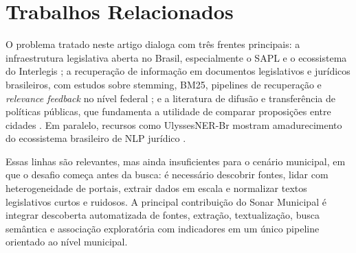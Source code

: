 \section{Trabalhos Relacionados}

O problema tratado neste artigo dialoga com três frentes principais: a infraestrutura legislativa aberta no Brasil, especialmente o SAPL e o ecossistema do Interlegis \cite{interlegis_sapl}; a recuperação de informação em documentos legislativos e jurídicos brasileiros, com estudos sobre stemming, BM25, pipelines de recuperação e \textit{relevance feedback} no nível federal \cite{souza_stemming_2021,vitorio_ir_pipeline_2021,vitorio_rfcorpus_2025}; e a literatura de difusão e transferência de políticas públicas, que fundamenta a utilidade de comparar proposições entre cidades \cite{shipan_volden_2008}. Em paralelo, recursos como UlyssesNER-Br mostram amadurecimento do ecossistema brasileiro de NLP jurídico \cite{albuquerque_ulyssesner_2022}.

Essas linhas são relevantes, mas ainda insuficientes para o cenário municipal, em que o desafio começa antes da busca: é necessário descobrir fontes, lidar com heterogeneidade de portais, extrair dados em escala e normalizar textos legislativos curtos e ruidosos. A principal contribuição do Sonar Municipal é integrar descoberta automatizada de fontes, extração, textualização, busca semântica e associação exploratória com indicadores em um único pipeline orientado ao nível municipal.
